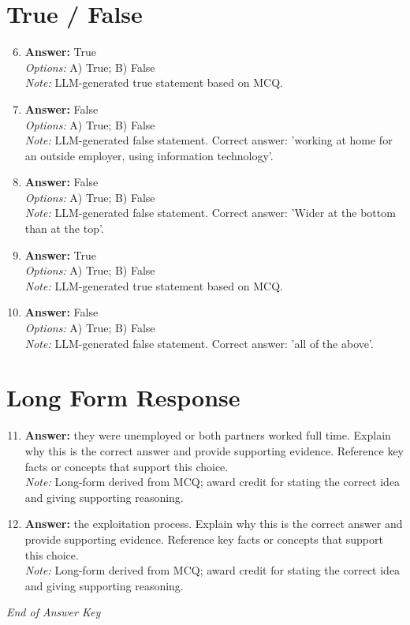 \documentclass[12pt]{article}
\begin{document}
\section*{True / False}
\begin{enumerate}[label=\arabic*.]
\setcounter{enumi}{5}
\item \textbf{Answer:} True
\\ \textit{Options:} A) True; B) False
\\ \textit{Note:} LLM-generated true statement based on MCQ.
\item \textbf{Answer:} False
\\ \textit{Options:} A) True; B) False
\\ \textit{Note:} LLM-generated false statement. Correct answer: 'working at home for an outside employer, using information technology'.
\item \textbf{Answer:} False
\\ \textit{Options:} A) True; B) False
\\ \textit{Note:} LLM-generated false statement. Correct answer: 'Wider at the bottom than at the top'.
\item \textbf{Answer:} True
\\ \textit{Options:} A) True; B) False
\\ \textit{Note:} LLM-generated true statement based on MCQ.
\item \textbf{Answer:} False
\\ \textit{Options:} A) True; B) False
\\ \textit{Note:} LLM-generated false statement. Correct answer: 'all of the above'.
\end{enumerate}

\section*{Long Form Response}
\begin{enumerate}[label=\arabic*.]
\setcounter{enumi}{10}
\item \textbf{Answer:} they were unemployed or both partners worked full time. Explain why this is the correct answer and provide supporting evidence. Reference key facts or concepts that support this choice.
\\ \textit{Note:} Long-form derived from MCQ; award credit for stating the correct idea and giving supporting reasoning.
\item \textbf{Answer:} the exploitation process. Explain why this is the correct answer and provide supporting evidence. Reference key facts or concepts that support this choice.
\\ \textit{Note:} Long-form derived from MCQ; award credit for stating the correct idea and giving supporting reasoning.
\end{enumerate}

\vfill
\noindent\textit{End of Answer Key}
\end{document}
